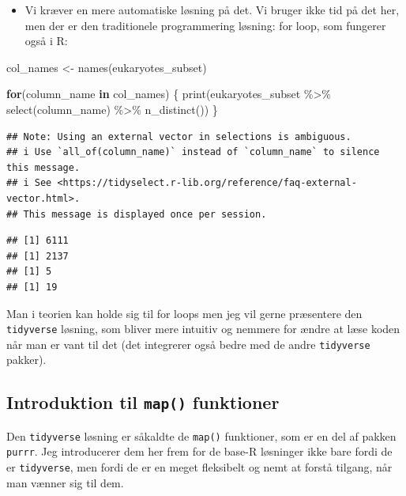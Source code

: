\documentclass[
]{book}
\newenvironment{Shaded}{\begin{snugshade}}{\end{snugshade}}
\newcommand{\ControlFlowTok}[1]{\textcolor[rgb]{0.13,0.29,0.53}{\textbf{#1}}}
\newcommand{\FunctionTok}[1]{\textcolor[rgb]{0.00,0.00,0.00}{#1}}
\newcommand{\NormalTok}[1]{#1}
\newcommand{\OtherTok}[1]{\textcolor[rgb]{0.56,0.35,0.01}{#1}}
\newcommand{\SpecialCharTok}[1]{\textcolor[rgb]{0.00,0.00,0.00}{#1}}
\providecommand{\tightlist}{%
  \setlength{\itemsep}{0pt}\setlength{\parskip}{0pt}}
\begin{document}
\begin{itemize}
\tightlist
\item
  Vi kræver en mere automatiske løsning på det. Vi bruger ikke tid på det her, men der er den traditionele programmering løsning: for loop, som fungerer også i R:
\end{itemize}

\begin{Shaded}
\begin{Highlighting}[]
\NormalTok{col\_names }\OtherTok{\textless{}{-}} \FunctionTok{names}\NormalTok{(eukaryotes\_subset)}

\ControlFlowTok{for}\NormalTok{(column\_name }\ControlFlowTok{in}\NormalTok{ col\_names)}
\NormalTok{\{}
  \FunctionTok{print}\NormalTok{(eukaryotes\_subset }\SpecialCharTok{\%\textgreater{}\%} 
          \FunctionTok{select}\NormalTok{(column\_name) }\SpecialCharTok{\%\textgreater{}\%} 
          \FunctionTok{n\_distinct}\NormalTok{())}
\NormalTok{\}}
\end{Highlighting}
\end{Shaded}

\begin{verbatim}
## Note: Using an external vector in selections is ambiguous.
## i Use `all_of(column_name)` instead of `column_name` to silence this message.
## i See <https://tidyselect.r-lib.org/reference/faq-external-vector.html>.
## This message is displayed once per session.
\end{verbatim}

\begin{verbatim}
## [1] 6111
## [1] 2137
## [1] 5
## [1] 19
\end{verbatim}

Man i teorien kan holde sig til for loops men jeg vil gerne præsentere den \texttt{tidyverse} løsning, som bliver mere intuitiv og nemmere for ændre at læse koden når man er vant til det (det integrerer også bedre med de andre \texttt{tidyverse} pakker).

\hypertarget{introduktion-til-map-funktioner}{%
\subsection{\texorpdfstring{Introduktion til \texttt{map()} funktioner}{Introduktion til map() funktioner}}\label{introduktion-til-map-funktioner}}

Den \texttt{tidyverse} løsning er såkaldte de \texttt{map()} funktioner, som er en del af pakken \texttt{purrr}. Jeg introducerer dem her frem for de base-R løsninger ikke bare fordi de er \texttt{tidyverse}, men fordi de er en meget fleksibelt og nemt at forstå tilgang, når man vænner sig til dem.
\end{document}
